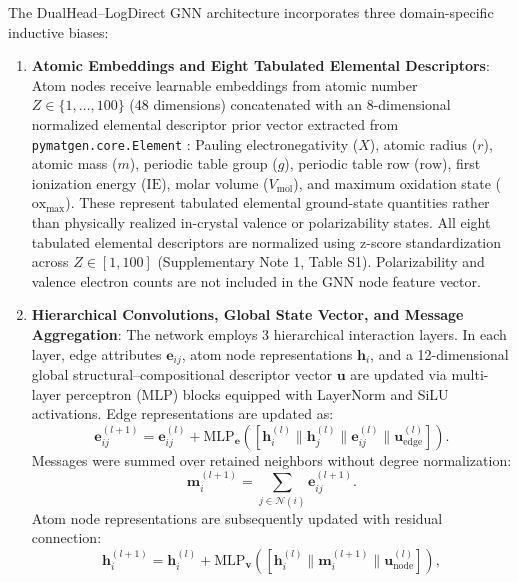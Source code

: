 \documentclass[journal,article,submit,moreauthors,pdftex]{article}
\begin{document}
The DualHead--LogDirect GNN architecture incorporates three domain-specific inductive biases:
\begin{enumerate}
    \item \textbf{Atomic Embeddings and Eight Tabulated Elemental Descriptors}: Atom nodes receive learnable embeddings from atomic number $Z \in \{1, \dots, 100\}$ (48 dimensions) concatenated with an 8-dimensional normalized elemental descriptor prior vector extracted from \texttt{pymatgen.core.Element} \cite{ong2013python}: Pauling electronegativity ($X$), atomic radius ($r$), atomic mass ($m$), periodic table group ($g$), periodic table row ($\text{row}$), first ionization energy ($\text{IE}$), molar volume ($V_{\mathrm{mol}}$), and maximum oxidation state ($\text{ox}_{\max}$). These represent tabulated elemental ground-state quantities rather than physically realized in-crystal valence or polarizability states. All eight tabulated elemental descriptors are normalized using z-score standardization across $Z \in [1, 100]$ (Supplementary Note 1, Table S1). Polarizability and valence electron counts are not included in the GNN node feature vector.
    \item \textbf{Hierarchical Convolutions, Global State Vector, and Message Aggregation}: The network employs 3 hierarchical interaction layers. In each layer, edge attributes $\mathbf{e}_{ij}$, atom node representations $\mathbf{h}_i$, and a 12-dimensional global structural--compositional descriptor vector $\mathbf{u}$ are updated via multi-layer perceptron (MLP) blocks equipped with LayerNorm and SiLU activations. Edge representations are updated as:
    \begin{equation}
        \mathbf{e}_{ij}^{(l+1)} = \mathbf{e}_{ij}^{(l)} + \mathrm{MLP}_{\mathbf{e}}\left([\mathbf{h}_i^{(l)} \parallel \mathbf{h}_j^{(l)} \parallel \mathbf{e}_{ij}^{(l)} \parallel \mathbf{u}_{\mathrm{edge}}^{(l)}]\right).
    \end{equation}
    Messages were summed over retained neighbors without degree normalization:
    \begin{equation}
        \mathbf{m}_i^{(l+1)} = \sum_{j \in \mathcal{N}(i)} \mathbf{e}_{ij}^{(l+1)}.
    \end{equation}
    Atom node representations are subsequently updated with residual connection:
    \begin{equation}
        \mathbf{h}_i^{(l+1)} = \mathbf{h}_i^{(l)} + \mathrm{MLP}_{\mathbf{v}}\left([\mathbf{h}_i^{(l)} \parallel \mathbf{m}_i^{(l+1)} \parallel \mathbf{u}_{\mathrm{node}}^{(l)}]\right),

\end{equation}
\end{enumerate}
\end{document}
